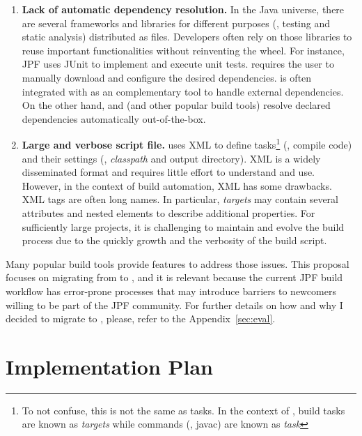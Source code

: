 \documentclass{article}
\begin{document}
\begin{enumerate}

\item \textbf{Lack of automatic dependency resolution.}
In the Java universe, there are several frameworks and libraries for different
purposes (\eg, testing and static analysis) distributed as \jar{} files.
Developers often rely on those libraries to reuse important functionalities
without reinventing the wheel.
For instance, JPF uses JUnit to implement and execute unit tests.
\ant{} requires the user to manually download and configure the desired
dependencies.
\ant{} is often integrated with \ivy{}\cite{page:ivy} as an complementary
tool to handle external dependencies.
On the other hand, \gradle{} and \maven{} (and other popular build tools)
resolve declared dependencies automatically out-of-the-box.

\item \textbf{Large and verbose script file.}
\ant{} uses XML to define tasks\footnote{To not confuse, this is not the same
as \ant{} tasks. In the context of \ant{}, build tasks are known as
\emph{targets} while commands (\eg, javac) are known as \emph{task}} (\eg,
compile code) and their settings (\eg, \emph{classpath} and output directory).
XML is a widely disseminated format and requires little effort to understand
and use.
However, in the context of build automation, XML has some drawbacks.
XML tags are often long names.
In particular, \ant{} \emph{targets} may contain several attributes and nested
elements to describe additional properties.
For sufficiently large projects, it is challenging to maintain and evolve the
build process due to the quickly growth and the verbosity of the build script.

\end{enumerate}

Many popular build tools provide features to address those issues.
This proposal focuses on migrating from \ant{} to \gradle{}, and it is relevant
because the current JPF build workflow has error-prone processes that may
introduce barriers to newcomers willing to be part of the JPF community.
For further details on how and why I decided to migrate to \gradle{}, please,
refer to the Appendix~\ref{sec:eval}.

\section{Implementation Plan}
\label{sec:plan}

\end{document}
